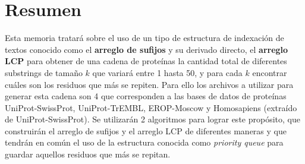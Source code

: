 \chapter*{Resumen}

Esta memoria tratará sobre el uso de un tipo de estructura de indexación de textos conocido como el \textbf{arreglo de sufijos} y su derivado directo, el \textbf{arreglo LCP} para obtener de una cadena de proteínas la cantidad total de diferentes substrings de tamaño $k$ que variará entre 1 hasta 50, y para cada $k$ encontrar cuáles son los residuos que más se repiten. Para ello los archivos a utilizar para generar esta cadena son 4 que corresponden a las bases de datos de proteínas UniProt-SwissProt, UniProt-TrEMBL, EROP-Moscow y Homosapiens (extraído de UniProt-SwissProt). Se utilizarán 2 algoritmos para lograr este propósito, que construirán el arreglo de sufijos y el arreglo LCP de diferentes maneras y que tendrán en común el uso de la estructura conocida como \textit{priority queue} para guardar aquellos residuos que más se repitan.

